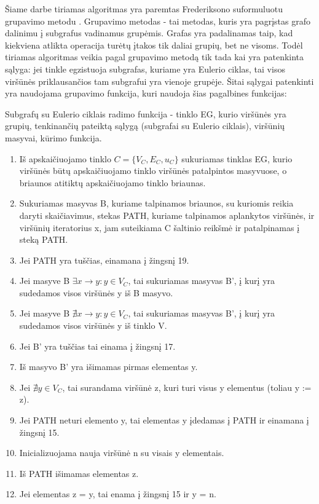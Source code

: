 Šiame darbe tiriamas algoritmas yra paremtas Frederiksono suformuluotu grupavimo metodu \cite{DSfUoMST}. Grupavimo metodas - tai metodas, kuris yra pagrįstas grafo dalinimu į subgrafus vadinamus grupėmis. Grafas yra padalinamas taip, kad kiekviena atlikta operacija turėtų įtakos tik daliai grupių, bet ne visoms. Todėl tiriamas algoritmas veikia pagal grupavimo metodą tik tada kai yra patenkinta sąlyga: jei tinkle egzistuoja subgrafas, kuriame yra Eulerio ciklas, tai visos viršūnės priklausančios tam subgrafui yra vienoje grupėje. Šitai sąlygai patenkinti yra naudojama grupavimo funkcija, kuri naudoja šias pagalbines funkcijas:

Subgrafų su Eulerio ciklais radimo funkcija - tinklo EG, kurio viršūnės yra grupių, tenkinančių pateiktą sąlygą (subgrafai su Eulerio ciklais), viršūnių masyvai, kūrimo funkcija.
\begin{enumerate}
	\item Iš apskaičiuojamo tinklo $C=\{V_C, E_C, u_C\}$ sukuriamas tinklas EG, kurio viršūnės būtų apskaičiuojamo tinklo viršūnės patalpintos masyvuose, o briaunos atitiktų apskaičiuojamo tinklo briaunas.
	\item Sukuriamas masyvas B, kuriame talpinamos briaunos, su kuriomis reikia daryti skaičiavimus, stekas PATH, kuriame talpinamos aplankytos viršūnės, ir viršūnių iteratorius x, jam suteikiama C šaltinio reikšmė ir patalpinamas į steką PATH.
	\item Jei PATH yra tuščias, einamana į žingsnį 19.
	\item Jei masyve B $\exists x \rightarrow y : y \in V_C$, tai sukuriamas masyvas B', į kurį yra sudedamos visos viršūnės y iš B masyvo.
	\item Jei masyve B $\nexists x \rightarrow y : y \in V_C$, tai sukuriamas masyvas B', į kurį yra sudedamos visos viršūnės y iš tinklo V.
	\item Jei B' yra tuščias tai einama į žingsnį 17.
	\item Iš masyvo B' yra išimamas pirmas elementas y.
	\item Jei $\nexists y \in V_C$, tai surandama viršūnė z, kuri turi visus y elementus (toliau y := z).
	\item Jei PATH neturi elemento y, tai elementas y įdedamas į PATH ir einamana į žingsnį 15.
	\item Inicializuojama nauja viršūnė n su visais y elementais.
	\item Iš PATH išimamas elementas z.
	\item Jei elementas z = y, tai enama į žingsnį 15 ir y = n.

\end{enumerate}
